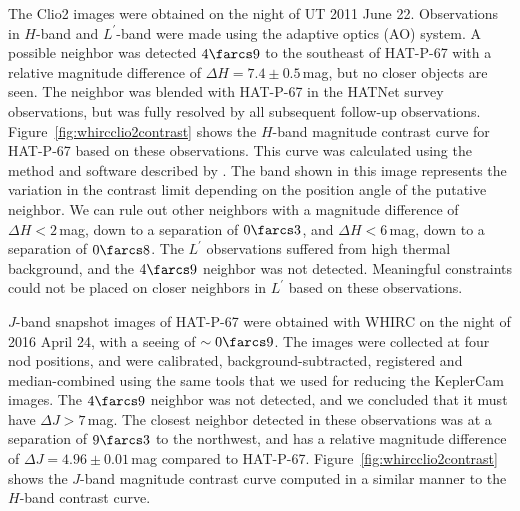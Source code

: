 \documentclass[apjl]{emulateapj}
\begin{document}
%
%
\begin{figure*}[!ht]
\caption[]{
    Contrast curve for HAT-P-67 in
    the ({\em Left}) $J$-band based on observations
    made with WHIRC on the WIYN~3.5\,m and ({\em Right}) the $H$-band based on Clio2/MMT observations as described in
    Section~\ref{sec:image}. The bands show the variation in the
    contrast limits depending on the position angle of the putative
    neighbor.
\label{fig:whircclio2contrast}}
\end{figure*}


The Clio2 images were obtained on the night of UT
2011 June 22.  Observations in $H$-band and
$L^{\prime}$-band were made using the adaptive optics (AO)
system. A possible neighbor was detected $4\farcs9$ to the southeast of HAT-P-67 with a relative magnitude difference of $\Delta H = 7.4 \pm 0.5$\,mag, but no closer objects are seen.  The neighbor was blended with HAT-P-67 in the HATNet survey observations, but was fully resolved by all subsequent follow-up observations. Figure~\ref{fig:whircclio2contrast} shows the $H$-band magnitude contrast curve for HAT-P-67 based on these observations. This curve was calculated using the method and software
described by \citet{2016AJ....152..108E}. The band shown in this
image represents the variation in the contrast limit depending on the
position angle of the putative neighbor. We can rule out other neighbors with a magnitude difference of $\Delta H < 2$\,mag, down to a separation of $0\farcs3$, and $\Delta H < 6$\,mag, down to a separation of $0\farcs8$. The $L^{\prime}$ observations suffered from high thermal background, and the $4\farcs9$ neighbor was not detected. Meaningful constraints could not be placed on closer neighbors in $L^{\prime}$ based on these observations.

$J$-band snapshot images of HAT-P-67 were obtained with WHIRC on the night of 2016 April 24, with a seeing of $\sim 0\farcs9$. The images were collected at four nod positions, and were calibrated, background-subtracted, registered and median-combined using the same tools that we used for reducing the KeplerCam images. The $4\farcs9$ neighbor was not detected, and we concluded that it must have $\Delta J > 7$\,mag. The closest neighbor detected in these observations was at a separation of $9\farcs3$ to the northwest, and has a relative magnitude difference of $\Delta J = 4.96 \pm 0.01$\,mag compared to HAT-P-67. Figure~\ref{fig:whircclio2contrast} shows the $J$-band magnitude
contrast curve computed in a similar manner to the $H$-band contrast curve.
\end{document}
